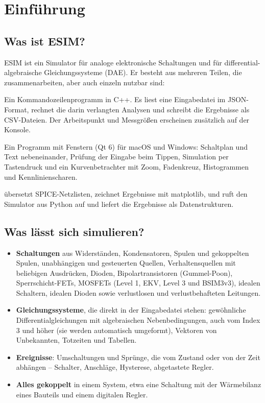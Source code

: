 \chapter{Einführung}
\label{kap:einfuehrung}

\section{Was ist ESIM?}

ESIM ist ein Simulator für analoge elektronische Schaltungen und für
differential-algebraische Gleichungssysteme (DAE). Er besteht aus
mehreren Teilen, die zusammenarbeiten, aber auch einzeln nutzbar sind:

\begin{description}[style=nextline,leftmargin=2em]
  \item[\esim\ – der Simulator]
    Ein Kommandozeilenprogramm in C++. Es liest eine Eingabedatei im
    JSON-Format, rechnet die darin verlangten Analysen und schreibt die
    Ergebnisse als CSV-Dateien. Der Arbeitspunkt und Messgrößen erscheinen
    zusätzlich auf der Konsole.
  \item[\editor\ – die Oberfläche]
    Ein Programm mit Fenstern (Qt 6) für macOS und Windows: Schaltplan und
    Text nebeneinander, Prüfung der Eingabe beim Tippen, Simulation per
    Tastendruck und ein Kurvenbetrachter mit Zoom, Fadenkreuz,
    Histogrammen und Kennlinienscharen.
  \item[Werkzeuge]
     übersetzt SPICE-Netzlisten,
     zeichnet Ergebnisse mit matplotlib, und
     ruft den Simulator aus Python auf und liefert die
    Ergebnisse als Datenstrukturen.
\end{description}

\section{Was lässt sich simulieren?}

\begin{itemize}
  \item \textbf{Schaltungen} aus Widerständen, Kondensatoren, Spulen und
    gekoppelten Spulen, unabhängigen und gesteuerten Quellen,
    Verhaltensquellen mit beliebigen Ausdrücken, Dioden,
    Bipolartransistoren (Gummel-Poon), Sperrschicht-FETs, MOSFETs (Level 1,
    EKV, Level 3 und BSIM3v3), idealen Schaltern, idealen Dioden sowie
    verlustlosen und verlustbehafteten Leitungen.
  \item \textbf{Gleichungssysteme}, die direkt in der Eingabedatei stehen:
    gewöhnliche Differentialgleichungen mit algebraischen Nebenbedingungen,
    auch vom Index 3 und höher (sie werden automatisch umgeformt), Vektoren
    von Unbekannten, Totzeiten und Tabellen.
  \item \textbf{Ereignisse}: Umschaltungen und Sprünge, die vom Zustand
    oder von der Zeit abhängen – Schalter, Anschläge, Hysterese, abgetastete
    Regler.
  \item \textbf{Alles gekoppelt} in einem System, etwa eine Schaltung mit
    der Wärmebilanz eines Bauteils und einem digitalen Regler.
\end{itemize}

